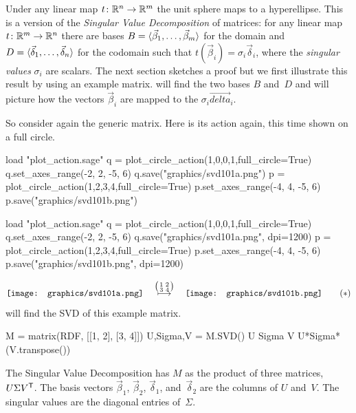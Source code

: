 Under any linear map $\mbox{$t\colon \mathbb{R}^n\to \mathbb{R}^m$}$ the 
unit sphere maps to a hyperellipse.
This is a version of the \textit{Singular Value Decomposition} of
matrices:
for any linear map $\mbox{$t\colon \mathbb{R}^m\to \mathbb{R}^n$}$ there are bases
$B=\langle\vec{\beta}_1,\ldots,\vec{\beta}_m\rangle$ for the domain and
$D=\langle\vec{\delta}_1,\ldots,\vec{\delta}_n\rangle$ for the codomain
such that $t(\vec{\beta}_i)=\sigma_i\vec{\delta}_i$, where the
\textit{singular values}
$\sigma_i$ are scalars.
The next section sketches a proof
but we first illustrate this result by using an example matrix.
\Sage{} will find the two bases $B$ and~$D$ and will picture how the 
vectors $\vec{\beta}_i$ 
are mapped to the $\sigma_i\vec{delta}_i$.

So consider again the generic matrix.
Here is its action again, this time shown
on a full circle.
\begin{sageoutput}[d,0,4;d,5,7]
load "plot_action.sage"
q = plot_circle_action(1,0,0,1,full_circle=True) 
q.set_axes_range(-2, 2, -5, 6) 
q.save("graphics/svd101a.png")
p = plot_circle_action(1,2,3,4,full_circle=True) 
p.set_axes_range(-4, 4, -5, 6) 
p.save("graphics/svd101b.png")
\end{sageoutput}
\begin{sagesilent}
load "plot_action.sage"
q = plot_circle_action(1,0,0,1,full_circle=True) 
q.set_axes_range(-2, 2, -5, 6) 
q.save("graphics/svd101a.png", dpi=1200)
p = plot_circle_action(1,2,3,4,full_circle=True) 
p.set_axes_range(-4, 4, -5, 6) 
p.save("graphics/svd101b.png", dpi=1200)
\end{sagesilent}
\begin{equation*}
  \vcenteredhbox{\texttt{[image: graphics/svd101a.png]}}
  \quad\mapsunder{\big (\begin{smallmatrix} 1 &2 \\ 3 &4 \end{smallmatrix}\big )}\quad
  \vcenteredhbox{\texttt{[image: graphics/svd101b.png]}}
  \tag{$*$}
\end{equation*}
\Sage{} will find the SVD of this example matrix.
\begin{sageoutput}
M = matrix(RDF, [[1, 2], [3, 4]])
U,Sigma,V = M.SVD()
U
Sigma
V
U*Sigma*(V.transpose())
\end{sageoutput}
\noindent 
The Singular Value Decomposition has $M$ as the product of
three matrices, $U\Sigma{{V}^{\textsf{T}}}$.
The basis vectors $\vec{\beta}_1$, $\vec{\beta}_2$, $\vec{\delta}_1$, 
and~$\vec{\delta}_2$ are the columns of $U$ and~$V$. 
The singular values are the diagonal entries of~$\Sigma$.
